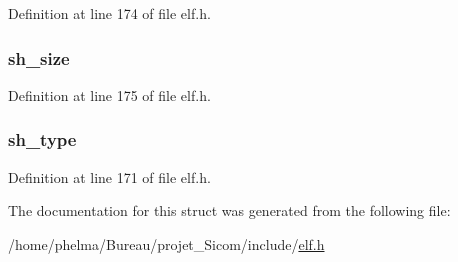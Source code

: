 Definition at line 174 of file elf.\-h.

\hypertarget{struct_elf64___shdr_ac70a9525b3a3b7462397ef65244d3449}{
\subsubsection[{sh\-\_\-size}]{ sh\-\_\-size}}\label{struct_elf64___shdr_ac70a9525b3a3b7462397ef65244d3449}


Definition at line 175 of file elf.\-h.

\hypertarget{struct_elf64___shdr_ad204bc45f1fa1d3cf3d14d502e585949}{
\subsubsection[{sh\-\_\-type}]{ sh\-\_\-type}}\label{struct_elf64___shdr_ad204bc45f1fa1d3cf3d14d502e585949}


Definition at line 171 of file elf.\-h.



The documentation for this struct was generated from the following file\-:\begin{DoxyCompactItemize}
\item 
/home/phelma/\-Bureau/projet\-\_\-\-Sicom/include/\hyperlink{elf_8h}{elf.\-h}\end{DoxyCompactItemize}
